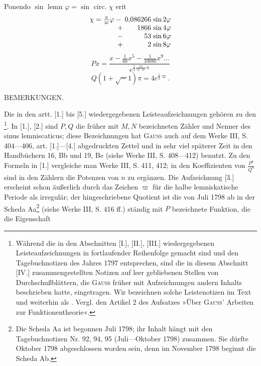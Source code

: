 \begingroup
\setlength{\headheight}{25pt}
\par\indent Ponendo \(\sin\text{ lemn }\varphi=\sin\text{ circ. }\chi\) erit
\[\begin{array}{r@{\;}r@{\;}l}
\chi=\frac{\pi}{\varpi}\varphi-{}&0{,}086266&\sin2\varphi\\
+{}&1866&\sin4\varphi\\
-{}&53&\sin6\varphi\\
+{}&2&\sin8\varphi
\end{array}\]
\[Px=\frac{x-\frac1{60}x^5-\frac1{10080}x^9\ldots}{e^{\frac12\frac{xx}{\varpi\varpi}\pi}}\]
\[Q(1+\surd-1)\pi=4e^{\frac12\varpi}.\]
\begin{center}\small BEMERKUNGEN.\end{center}
\renewcommand{\thefootnote}{*)}
\par\indent Die in den artt. [1.] bis [5.] wiedergegebenen Leisteaufzeichnungen gehören zu den \footnote{Während die in den Abschnitten [I.], [II.], [III.] wiedergegebenen Leisteaufzeichnungen in fortlaufender Reihenfolge gemacht sind und den Tagebuchnotizen des Jahres 1797 entsprechen, sind die in diesem Abschnitt [IV.] zusammengestellten Notizen auf leer gebliebenen Stellen von Durchschußblättern, die \textsc{Gauss} früher mit Aufzeichnungen andern Inhalts beschrieben hatte, eingetragen. Wir bezeichnen solche Leistenotizen im Text und weiterhin als . Vergl. den Artikel 2 des Aufsatzes »Über \textsc{Gauss}' Arbeiten zur Funktionentheorie«.}.
In [1.], [2.] sind \(P,Q\) die früher mit \(M,N\) bezeichneten Zähler und Nenner des sinus lemniscaticus; diese Bezeichnungen hat \textsc{Gauss} auch auf dem Werke III, S. 404---406, art. [1.]---[4.] abgedruckten Zettel und in sehr viel späterer Zeit in den Handbüchern 16, Bb und 19, Be (siehe Werke III, S. 408---412) benutzt. Zu den Formeln in [1.] vergleiche man Werke III, S. 411, 412; in den Koeffizienten von \(\frac{P^8}{Q^8}\) sind in den Zählern die Potenzen von \(n\) zu ergänzen. Die Aufzeichnung [3.] erscheint schon äußerlich durch das Zeichen \(\varpi\) für die halbe lemniskatische Periode als irregulär; der hingeschriebene Quotient ist die von Juli 1798 ab in der Scheda Aa\renewcommand{\thefootnote}{**)}\footnote{Die Scheda Aa ist begonnen Juli 1798; ihr Inhalt hängt mit den Tagebuchnotizen Nr. 92, 94, 95 (Juli---Oktober 1798) zusammen. Sie dürfte Oktober 1798 abgeschlossen worden sein, denn im November 1798 beginnt die Scheda Ab.} (siehe Werke III, S. 416 ff.) ständig mit \(P\) bezeichnete Funktion, die die Eigenschaft
